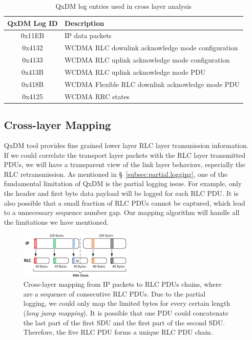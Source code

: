 \begin{table}[t!]
\begin{tabularx}{0.48\textwidth}{ | c | X | }
	\hline
  	\textbf{QxDM Log ID} & \textbf{Description} \\
  	\hline\hline
  	0x11EB & IP data packets \\
  	\hline
  	0x4132 & WCDMA RLC downlink acknowledge mode configuration \\
  	\hline
  	0x4133 & WCDMA RLC uplink acknowledge mode configuration \\
  	\hline
  	0x413B & WCDMA RLC uplink acknowledge mode PDU \\
  	\hline
  	0x418B & WCDMA Flexible RLC downlink acknowledge mode PDU \\
  	\hline
  	0x4125 & WCDMA RRC states \\
  	\hline
\end{tabularx}
\caption{QxDM log entries used in cross layer analysis}
\label{tab:QxDM.logs}
\end{table}

\subsection{Cross-layer Mapping}
\label{subsec:cross-layer.mapping}
QxDM tool provides fine grained lower layer RLC layer transmission information. If we could correlate the transport layer packets with the RLC layer transmitted PDUs, we will have a transparent view of the link layer behaviors, especially the RLC retransmission. As mentioned in \S~\ref{subsec:partial.logging}, one of the fundamental limitation of QxDM is the partial logging issue. For example, only the header and first byte data payload will be logged for each RLC PDU. It is also possible that a small fraction of RLC PDUs cannot be captured, which lead to a unnecessary sequence number gap. Our mapping algorithm will handle all the limitations we have mentioned.

\begin{figure}[t!]
\centering
\includegraphics[width=0.5\textwidth]{figs/cross_layer_mapping.eps}
\caption{Cross-layer mapping from IP packets to RLC PDUs chains, where are a sequence of consecutive RLC PDUs. Due to the partial logging, we could only map the limited bytes for every certain length (\textit{long jump mapping}). It is possible that one PDU could concatenate the last part of the first SDU and the first part of the second SDU. Therefore, the five RLC PDU forms a unique RLC PDU chain.}
\label{fig:cross.layer.mapping}
\end{figure}

